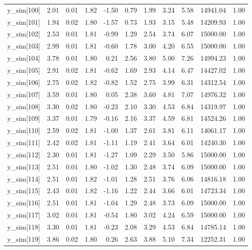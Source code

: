 \begin{table}[ht]
\begin{tabular}{rrrrrrrrrrr}
  y\_sim[100] & 2.01 & 0.01 & 1.82 & -1.50 & 0.79 & 1.99 & 3.24 & 5.58 & 14941.04 & 1.00 \\ 
  y\_sim[101] & 1.94 & 0.02 & 1.80 & -1.57 & 0.73 & 1.93 & 3.15 & 5.48 & 14209.93 & 1.00 \\ 
  y\_sim[102] & 2.53 & 0.01 & 1.81 & -0.99 & 1.29 & 2.54 & 3.74 & 6.07 & 15000.00 & 1.00 \\ 
  y\_sim[103] & 2.99 & 0.01 & 1.81 & -0.60 & 1.78 & 3.00 & 4.20 & 6.55 & 15000.00 & 1.00 \\ 
  y\_sim[104] & 3.78 & 0.01 & 1.80 & 0.21 & 2.56 & 3.80 & 5.00 & 7.26 & 14994.23 & 1.00 \\ 
  y\_sim[105] & 2.91 & 0.02 & 1.81 & -0.62 & 1.69 & 2.93 & 4.14 & 6.47 & 14427.02 & 1.00 \\ 
  y\_sim[106] & 2.75 & 0.02 & 1.82 & -0.82 & 1.52 & 2.75 & 3.99 & 6.31 & 14312.54 & 1.00 \\ 
  y\_sim[107] & 3.59 & 0.01 & 1.80 & 0.05 & 2.38 & 3.60 & 4.81 & 7.07 & 14976.32 & 1.00 \\ 
  y\_sim[108] & 3.30 & 0.02 & 1.80 & -0.23 & 2.10 & 3.30 & 4.53 & 6.84 & 14319.97 & 1.00 \\ 
  y\_sim[109] & 3.37 & 0.01 & 1.79 & -0.16 & 2.16 & 3.37 & 4.59 & 6.81 & 14524.26 & 1.00 \\ 
  y\_sim[110] & 2.59 & 0.02 & 1.81 & -1.00 & 1.37 & 2.61 & 3.81 & 6.11 & 14061.17 & 1.00 \\ 
  y\_sim[111] & 2.42 & 0.02 & 1.81 & -1.11 & 1.19 & 2.41 & 3.64 & 6.01 & 14240.30 & 1.00 \\ 
  y\_sim[112] & 2.30 & 0.01 & 1.81 & -1.27 & 1.09 & 2.29 & 3.50 & 5.86 & 15000.00 & 1.00 \\ 
  y\_sim[113] & 2.51 & 0.01 & 1.80 & -1.02 & 1.30 & 2.48 & 3.74 & 6.09 & 15000.00 & 1.00 \\ 
  y\_sim[114] & 2.51 & 0.01 & 1.82 & -1.01 & 1.28 & 2.51 & 3.76 & 6.06 & 14816.18 & 1.00 \\ 
  y\_sim[115] & 2.43 & 0.01 & 1.82 & -1.16 & 1.22 & 2.44 & 3.66 & 6.01 & 14723.34 & 1.00 \\ 
  y\_sim[116] & 2.51 & 0.01 & 1.81 & -1.04 & 1.29 & 2.48 & 3.73 & 6.09 & 15000.00 & 1.00 \\ 
  y\_sim[117] & 3.02 & 0.01 & 1.81 & -0.54 & 1.80 & 3.02 & 4.24 & 6.59 & 15000.00 & 1.00 \\ 
  y\_sim[118] & 3.30 & 0.01 & 1.81 & -0.23 & 2.08 & 3.29 & 4.53 & 6.84 & 14785.14 & 1.00 \\ 
  y\_sim[119] & 3.86 & 0.02 & 1.80 & 0.26 & 2.63 & 3.88 & 5.10 & 7.34 & 12252.31 & 1.00 \\ 

\end{tabular}
\end{table}
